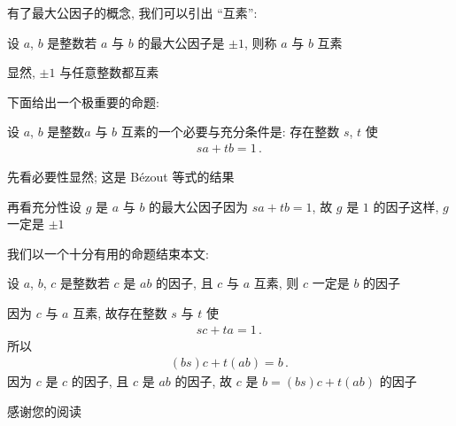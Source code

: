有了最大公因子的概念, 我们可以引出 ``互素'':
\begin{definition}
    设 $a$, $b$ 是整数\period 若 $a$ 与 $b$ 的最大公因子是 $\pm 1$, 则称 $a$ 与 $b$ 互素 \period
\end{definition}

\begin{example}
    显然, $\pm 1$ 与任意整数都互素\period
\end{example}

下面给出一个极重要的命题:
\begin{proposition}
    设 $a$, $b$ 是整数\period $a$ 与 $b$ 互素的一个必要与充分条件是: 存在整数 $s$, $t$ 使
    \begin{align*}
        sa + tb = 1 \period
    \end{align*}
\end{proposition}

\begin{pf}
    先看必要性\period 显然; 这是 Bézout 等式的结果\period

    再看充分性\period 设 $g$ 是 $a$ 与 $b$ 的最大公因子\period 因为 $sa + tb = 1$, 故 $g$ 是 $1$ 的因子\period 这样, $g$ 一定是 $\pm 1$\period
\end{pf}

我们以一个十分有用的命题结束本文:
\begin{proposition}
    设 $a$, $b$, $c$ 是整数\period 若 $c$ 是 $ab$ 的因子, 且 $c$ 与 $a$ 互素, 则 $c$ 一定是 $b$ 的因子\period
\end{proposition}

\begin{pf}
    因为 $c$ 与 $a$ 互素, 故存在整数 $s$ 与 $t$ 使
    \begin{align*}
        sc + ta = 1 \period
    \end{align*}
    所以
    \begin{align*}
        (bs)c + t(ab) = b \period
    \end{align*}
    因为 $c$ 是 $c$ 的因子, 且 $c$ 是 $ab$ 的因子, 故 $c$ 是 $b = (bs)c + t(ab)$ 的因子\period
\end{pf}

感谢您的阅读\period
